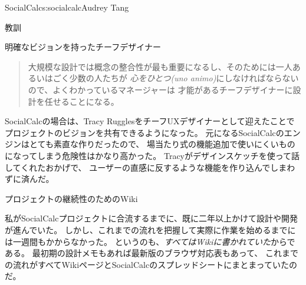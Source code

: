 \begin{aosachapter}{SocialCalc}{s:socialcalc}{Audrey Tang}
\begin{aosasect1}{教訓}
\begin{aosasect2}{明確なビジョンを持ったチーフデザイナー}
\begin{quotation}

  \noindent
  大規模な設計では概念の整合性が最も重要になるし、そのためには一人あるいはごく少数の人たちが
  \emph{心をひとつ(uno animo)}にしなければならないので、よくわかっているマネージャーは
  才能があるチーフデザイナーに設計を任せることになる。

\end{quotation}

SocialCalcの場合は、Tracy RugglesをチーフUXデザイナーとして迎えたことで
プロジェクトのビジョンを共有できるようになった。
元になるSocialCalcのエンジンはとても素直な作りだったので、
場当たり式の機能追加で使いにくいものになってしまう危険性はかなり高かった。
Tracyがデザインスケッチを使って話してくれたおかげで、
ユーザーの直感に反するような機能を作り込んでしまわずに済んだ。

\end{aosasect2}

\begin{aosasect2}{プロジェクトの継続性のためのWiki}

私がSocialCalcプロジェクトに合流するまでに、既に二年以上かけて設計や開発が進んでいた。
しかし、これまでの流れを把握して実際に作業を始めるまでには一週間もかからなかった。
というのも、\emph{すべてはWikiに書かれていた}からである。
最初期の設計メモもあれば最新版のブラウザ対応表もあって、
これまでの流れがすべてWikiページとSocialCalcのスプレッドシートにまとまっていたのだ。


\end{aosasect2}
\end{aosasect1}
\end{aosachapter}
